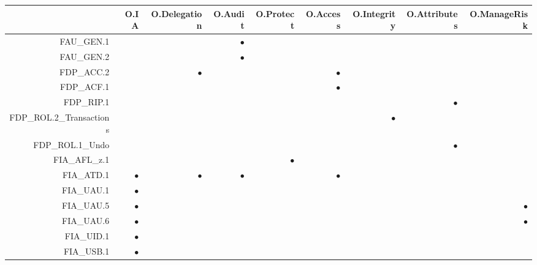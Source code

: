 \documentclass[12pt,english]{scrbook}
\newcommand{\oh}{$\bullet$}
\begin{document}
\begin{longtable}{rRRRRRRRR}
        \toprule
                            & O.IA & O.Delegation & O.Audit & O.Protect & O.Access & O.Integrity & O.Attributes & O.ManageRisk \\
        \midrule\endhead

FAU\_GEN.1                  &      &              & \oh     &           &          &             &              &              \\
FAU\_GEN.2                  &      &              & \oh     &           &          &             &              &              \\
FDP\_ACC.2                  &      & \oh          &         &           & \oh      &             &              &              \\
FDP\_ACF.1                  &      &              &         &           &  \oh     &             &              &              \\
FDP\_RIP.1                  &      &              &         &           &          &             &  \oh         &              \\
FDP\_ROL.2\_Transactions    &      &              &         &           &          &   \oh       &              &              \\
FDP\_ROL.1\_Undo            &      &              &         &           &          &             &  \oh         &              \\
FIA\_AFL\_z.1               &      &              &         &   \oh     &          &             &              &              \\
FIA\_ATD.1                  & \oh  &  \oh         &   \oh   &           & \oh      &             &              &              \\
FIA\_UAU.1                  & \oh  &              &         &           &          &             &              &              \\
FIA\_UAU.5                  & \oh  &              &         &           &          &             &              & \oh          \\
FIA\_UAU.6                  & \oh  &              &         &           &          &             &              & \oh          \\
FIA\_UID.1                  & \oh  &              &         &           &          &             &              &              \\
FIA\_USB.1                  & \oh  &              &         &           &          &             &              &              \\

\end{longtable}
\end{document}
